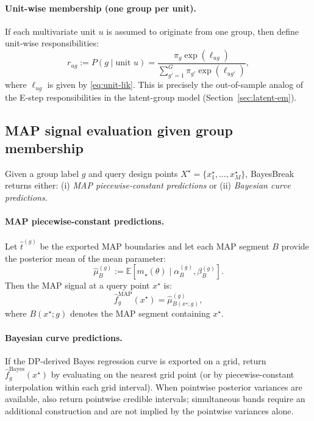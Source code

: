 \paragraph{Unit-wise membership (one group per unit).}
If each multivariate unit $u$ is assumed to originate from one group, then define unit-wise
responsibilities:
\begin{equation}
r_{u g}
:= P(g\mid \text{unit }u)
= \frac{\pi_g\exp(\ell_{u g})}{\sum_{g'=1}^G \pi_{g'}\exp(\ell_{u g'})},
\label{eq:unit-resp}
\end{equation}
where $\ell_{u g}$ is given by \eqref{eq:unit-lik}. This is precisely the out-of-sample analog
of the E-step responsibilities in the latent-group model (Section~\ref{sec:latent-em}).

\subsection{MAP signal evaluation given group membership}
\label{sec:map-eval}

Given a group label $g$ and query design points $X^\star=\{x^\star_1,\dots,x^\star_M\}$,
BayesBreak returns either:
(i) \emph{MAP piecewise-constant predictions} or (ii) \emph{Bayesian curve predictions}.

\paragraph{MAP piecewise-constant predictions.}
Let $\widehat{t}^{(g)}$ be the exported MAP boundaries and let each MAP segment $B$ provide
the posterior mean of the mean parameter:
\[
\widehat{\mu}^{(g)}_B := \mathbb{E}[m_\star(\theta)\mid \alpha^{(g)}_B,\beta^{(g)}_B].
\]
Then the MAP signal at a query point $x^\star$ is:
\[
\widehat{f}^{\text{MAP}}_g(x^\star) = \widehat{\mu}^{(g)}_{B(x^\star;g)},
\]
where $B(x^\star;g)$ denotes the MAP segment containing $x^\star$.

\paragraph{Bayesian curve predictions.}
If the DP-derived Bayes regression curve is exported on a grid, return
$\widehat{f}^{\text{Bayes}}_g(x^\star)$ by evaluating on the nearest grid point (or by
piecewise-constant interpolation within each grid interval). When pointwise posterior
variances are available, also return pointwise credible intervals; simultaneous bands require an
additional construction and are not implied by the pointwise variances alone.

